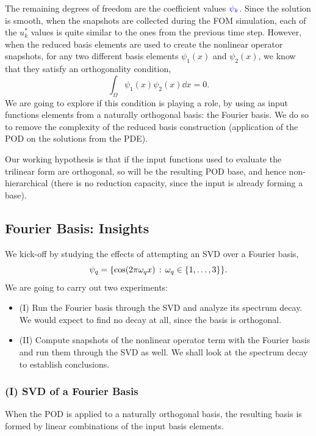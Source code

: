 \documentclass[../../thesis.tex]{subfiles}
\begin{document}
The remaining degrees of freedom are the coefficient values 
$\textcolor{blue}{\psi_k}$.
Since the solution is smooth,
when the snapshots are collected during the FOM simulation, 
each of the $u_k^{*}$ values is quite similar to the ones from the previous time step.
However, when the reduced basis elements are used to create 
the nonlinear operator snapshots, 
for any two different basis elements $\psi_1(x)$ and $\psi_2(x)$,
we know that they satisfy an orthogonality condition,
\begin{equation}
    \int_\Omega \psi_1(x) \psi_2(x) \dd x = 0.
\end{equation}
We are going to explore if this condition is playing a role, 
by using as input functions elements from a naturally orthogonal basis:
the Fourier basis.
We do so to remove the complexity of the reduced basis construction 
(application of the POD on the solutions from the PDE). 

Our working hypothesis is that if the input functions used to evaluate the 
trilinear form are orthogonal, so will be the resulting POD base,
and hence non-hierarchical 
(there is no reduction capacity, since the input is already forming a base).

\subsection{Fourier Basis: Insights}
We kick-off by studying the effects of attempting an SVD over a Fourier basis, 
\begin{equation}
    \psi_q = \qty{\cos(2 \pi \omega_q x) \, : \, \omega_q \in \qty{1, \ldots, 3}}.
\end{equation}
We are going to carry out two experiments:
\begin{itemize}
    \item (I) Run the Fourier basis through the SVD and analyze its spectrum decay. 
    We would expect to find no decay at all, since the basis is orthogonal.
    \item (II) Compute snapshots of the nonlinear operator term with the Fourier basis
    and run them through the SVD as well.
    We shall look at the spectrum decay to establish conclusions. 
\end{itemize}

\subsubsection{(I) SVD of a Fourier Basis}
When the POD is applied to a naturally orthogonal basis, 
the resulting basis is formed by linear combinations of the input basis elements.
\end{document}
